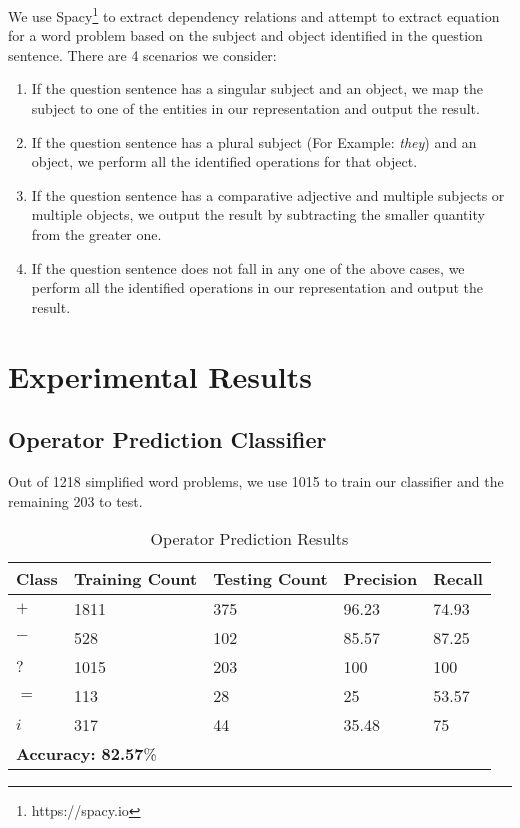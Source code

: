 \documentclass[11pt]{article}
\begin{document}
We use Spacy\footnote{https://spacy.io} to extract dependency relations and attempt to extract equation for a word problem based on the subject and object identified in the question sentence. There are 4 scenarios we consider:
\begin{enumerate}[topsep=0pt,itemsep=-1ex,partopsep=1ex,parsep=1ex]
\item If the question sentence has a singular subject and an object, we map the subject to one of the entities in our representation and output the result.
\item If the question sentence has a plural subject (For Example: \textit{they}) and an object, we perform all the identified operations for that object.
\item If the question sentence has a comparative adjective and multiple subjects or multiple objects, we output the result by subtracting the smaller quantity from the greater one.
\item If the question sentence does not fall in any one of the above cases, we perform all the identified operations in our representation and output the result.
\end{enumerate}


\section{Experimental Results}
\subsection{Operator Prediction Classifier}
Out of 1218 simplified word problems, we use 1015 to train our classifier and the remaining 203 to test. 

\begin{table}[h!]
\centering
\begin{tabular}{|m{0.8cm}|m{1.4cm}|m{1.4cm}|m{1.4cm}|m{1cm}|}
\hline
\textbf{Class} & \textbf{Training Count} & \textbf{Testing Count} & \textbf{Precision} & \textbf{Recall} \\ \hline
$\mathit{+}$ & 1811 & 375 & 96.23 & 74.93 \\ \hline
$\mathit{-}$ & 528 & 102 & 85.57 & 87.25 \\ \hline
$\mathit{?}$ & 1015 & 203 & 100 & 100 \\ \hline
$\mathit{=}$ & 113 & 28 & 25 & 53.57 \\ \hline
$\mathit{i}$ & 317 & 44 & 35.48 & 75 \\ \hline
\multicolumn{5}{|m{7cm}|}{\textbf{Accuracy: 82.57}\%} \\ \hline
\end{tabular}
\caption{Operator Prediction Results}
\label{figure:12}
\end{table}
\end{document}
